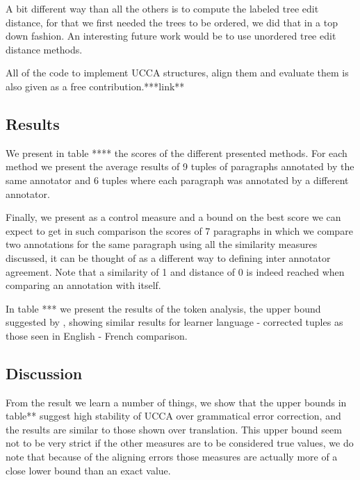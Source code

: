 \documentclass[11pt]{article}
\begin{document}
A bit different way than all the others is to compute the labeled
tree edit distance\cite{zhang1989simple}, for that we first needed
the trees to be ordered, we did that in a top down fashion. An interesting
future work would be to use unordered tree edit distance methods\cite{zhang1992editing}.

All of the code to implement UCCA structures, align them and evaluate
them is also given as a free contribution.{*}{*}{*}link{*}{*}

\subsection{Results}

We present in table {*}{*}{*}{*} the scores of the different presented
methods. For each method we present the average results of 9 tuples
of paragraphs annotated by the same annotator and 6 tuples where each
paragraph was annotated by a different annotator.

Finally, we present as a control measure and a bound on the best score
we can expect to get in such comparison the scores of 7 paragraphs
in which we compare two annotations for the same paragraph using all
the similarity measures discussed, it can be thought of as a different
way to defining inter annotator agreement. Note that a similarity
of 1 and distance of 0 is indeed reached when comparing an annotation
with itself.

In table {*}{*}{*} we present the results of the token analysis, the
upper bound suggested by \cite{sulem2015conceptual}, showing similar
results for learner language - corrected tuples as those seen in English
- French comparison.

\subsection{Discussion}

From the result we learn a number of things, we show that the upper
bounds in table{*}{*} suggest high stability of UCCA over grammatical
error correction, and the results are similar to those shown over
translation. This upper bound seem not to be very strict if the other
measures are to be considered true values, we do note that because
of the aligning errors those measures are actually more of a close
lower bound than an exact value.
\end{document}
